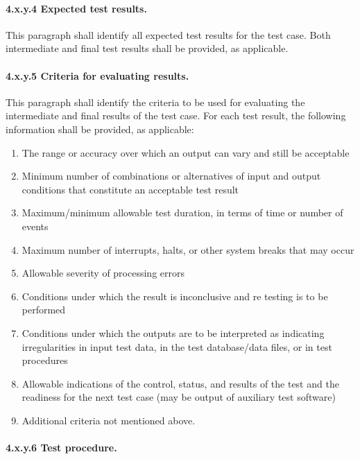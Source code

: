 \paragraph{4.x.y.4 Expected test results.}

This paragraph shall identify all expected test results for the test
case. Both intermediate and final test results shall be provided, as
applicable.

\paragraph{4.x.y.5 Criteria for evaluating results.}

This paragraph shall identify the criteria to be used for evaluating the
intermediate and final results of the test case. For each test result,
the following information shall be provided, as applicable:

\begin{enumerate}
\itemsep1pt\parskip0pt
\item
  The range or accuracy over which an output can vary and still be
  acceptable
\item
  Minimum number of combinations or alternatives of input and output
  conditions that constitute an acceptable test result
\item
  Maximum/minimum allowable test duration, in terms of time or number of
  events
\item
  Maximum number of interrupts, halts, or other system breaks that may
  occur
\item
  Allowable severity of processing errors
\item
  Conditions under which the result is inconclusive and re testing is to
  be performed
\item
  Conditions under which the outputs are to be interpreted as indicating
  irregularities in input test data, in the test database/data files, or
  in test procedures
\item
  Allowable indications of the control, status, and results of the test
  and the readiness for the next test case (may be output of auxiliary
  test software)
\item
  Additional criteria not mentioned above.
\end{enumerate}

\paragraph{4.x.y.6 Test procedure.}

